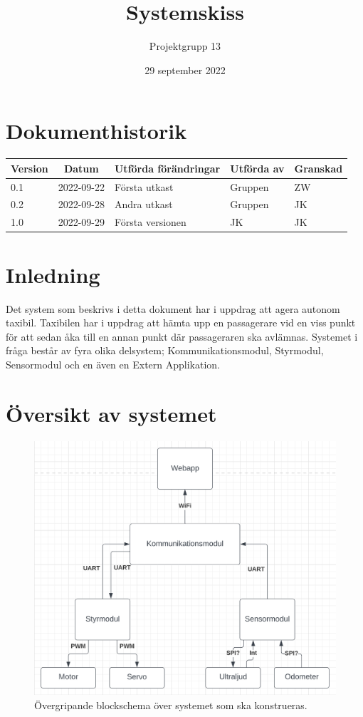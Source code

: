 \documentclass[10pt,oneside,swedish]{lips}
\title{Systemskiss}
\author{Projektgrupp 13}
\date{29 september 2022}
\begin{document}


\cleardoublepage
\tableofcontents

\cleardoublepage
\section*{Dokumenthistorik}
\begin{tabular}{p{}|p{}|p{}|p{}|p{}} 
  \multicolumn{1}{c}{\bfseries Version} & 
  \multicolumn{1}{|c}{\bfseries Datum} & 
  \multicolumn{1}{|c}{\bfseries Utförda förändringar} & 
  \multicolumn{1}{|c}{\bfseries Utförda av} & 
  \multicolumn{1}{|c}{\bfseries Granskad}\\
  \hline
  \hline
  0.1 & 2022-09-22 & Första utkast & Gruppen & ZW   \\
  \hline
  0.2 & 2022-09-28 & Andra utkast & Gruppen & JK   \\
  \hline
  1.0 & 2022-09-29 & Första versionen & JK & JK   \\
  \hline
\end{tabular}

\cleardoublepage
{}\cfoot{\thepage}

\section{Inledning}
Det system som beskrivs i detta dokument har i uppdrag att agera autonom taxibil. Taxibilen har i uppdrag att hämta upp en passagerare vid en viss punkt för att sedan åka till en annan punkt där passageraren ska avlämnas. Systemet i fråga består av fyra olika delsystem; Kommunikationsmodul, Styrmodul, Sensormodul och en även en Extern Applikation.  


\section{Översikt av systemet}

\begin{figure}[htbp]
  \centering
  \includegraphics[width=.5\textwidth]{./Figures/blockskiss.png}
  \caption{Övergripande blockschema över systemet som ska konstrueras.}
  \label{fig:blockskiss}
\end{figure}
\end{document}
